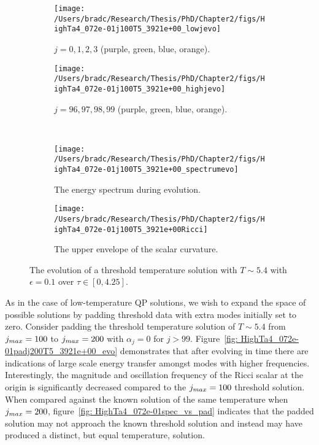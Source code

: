 \documentclass[../PhD.tex]{subfiles}
\begin{document}
\begin{figure}[ht]
	\centering
	\begin{subfigure}[t]{0.48\textwidth}
		\texttt{[image: /Users/bradc/Research/Thesis/PhD/Chapter2/figs/HighTa4\_072e-01j100T5\_3921e+00\_lowjevo]}
		\caption{$j = 0, 1, 2, 3$ (purple, green, blue, orange).}
	\end{subfigure}
	\;
	\begin{subfigure}[t]{0.48\textwidth}
		\texttt{[image: /Users/bradc/Research/Thesis/PhD/Chapter2/figs/HighTa4\_072e-01j100T5\_3921e+00\_highjevo]}
		\caption{$j=96, 97, 98, 99$ (purple, green, blue, orange).}
		\label{fig: HighTa4_072e-01j100T5_3921e+00_highjevo}
	\end{subfigure}
	\\
	\begin{subfigure}[t]{0.48\textwidth}
		\texttt{[image: /Users/bradc/Research/Thesis/PhD/Chapter2/figs/HighTa4\_072e-01j100T5\_3921e+00\_spectrumevo]}
		\caption{The energy spectrum during evolution.}
		\label{fig: HighTa4_072e-01j100T5_3921e+00_spectrumevo}
	\end{subfigure}
	\quad
	\begin{subfigure}[t]{0.48\textwidth}
		\texttt{[image: /Users/bradc/Research/Thesis/PhD/Chapter2/figs/HighTa4\_072e-01j100T5\_3921e+00Ricci]}
		\caption{The upper envelope of the scalar curvature.}
		\label{fig: HighTa4_072e-01j100T5_3921e+00Ricci}
	\end{subfigure}
	\caption[Examining the energy per mode during the evolution of a threshold temperature solution]{The evolution of a threshold temperature solution with $T \sim 5.4$ with $\epsilon = 0.1$ over $\tau \in [0, 4.25]$.}
	\label{fig:HighTa4_072e-01j100T5_3921e+00_evo}
\end{figure}

As in the case of low-temperature QP solutions, we wish to expand the space of possible solutions by padding threshold data with extra modes initially set to zero. Consider padding the threshold temperature solution of $T \sim 5.4$ from $j_{max} = 100$ to $j_{max} = 200$ with $\alpha_j = 0$ for $j > 99$. Figure~\ref{fig: HighTa4_072e-01padj200T5_3921e+00_evo} demonstrates that after evolving in time there are indications of large scale energy transfer amongst modes with higher frequencies. Interestingly, the magnitude and oscillation frequency of the Ricci scalar at the origin is significantly decreased compared to the $j_{max} = 100$ threshold solution. When compared against the known solution of the same temperature when $j_{max} = 200$, figure~\ref{fig: HighTa4_072e-01spec_vs_pad} indicates that the padded solution may not approach the known threshold solution and instead may have produced a distinct, but equal temperature, solution.
\end{document}
